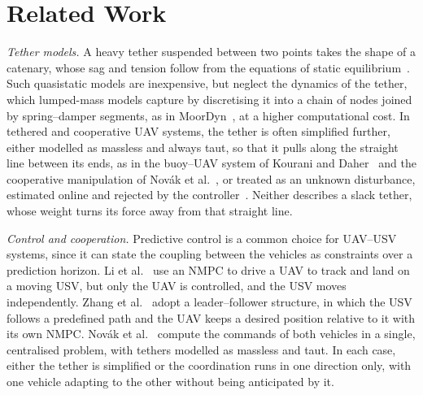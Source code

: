 \section{Related Work}
\label{sec:backg}

\textit{Tether models.} A heavy tether suspended between two points takes the shape of a catenary, whose sag and tension follow from the equations of static equilibrium~\cite{irvine1981cable}. Such quasistatic models are inexpensive, but neglect the dynamics of the tether, which lumped-mass models capture by discretising it into a chain of nodes joined by spring--damper segments, as in MoorDyn~\cite{hall2015moordyn}, at a higher computational cost. In tethered and cooperative UAV systems, the tether is often simplified further, either modelled as massless and always taut, so that it pulls along the straight line between its ends, as in the buoy--UAV system of Kourani and Daher~\cite{kouraniMarineLocomotionTethered2021} and the cooperative manipulation of Nov\'{a}k et al.~\cite{novakCollaborativeObjectManipulation2024}, or treated as an unknown disturbance, estimated online and rejected by the controller~\cite{yuReducedComplexityActiveDisturbance2023}. Neither describes a slack tether, whose weight turns its force away from that straight line.

\textit{Control and cooperation.} Predictive control is a common choice for UAV--USV systems, since it can state the coupling between the vehicles as constraints over a prediction horizon. Li et al.~\cite{liNMPCbasedUAVUSVCooperative2023} use an NMPC to drive a UAV to track and land on a moving USV, but only the UAV is controlled, and the USV moves independently. Zhang et al.~\cite{zhangCooperativeControlFramework2025} adopt a leader--follower structure, in which the USV follows a predefined path and the UAV keeps a desired position relative to it with its own NMPC. Nov\'{a}k et al.~\cite{novakCollaborativeObjectManipulation2024} compute the commands of both vehicles in a single, centralised problem, with tethers modelled as massless and taut. In each case, either the tether is simplified or the coordination runs in one direction only, with one vehicle adapting to the other without being anticipated by it.
